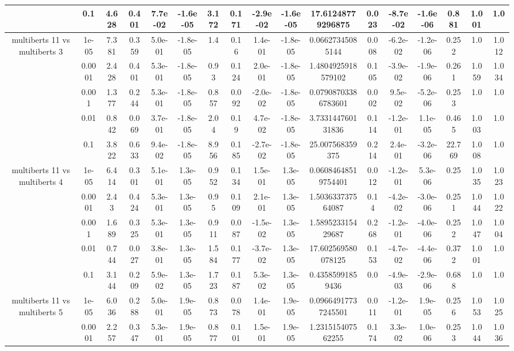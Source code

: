 \begin{tabular}{|c|c|c|c|c|c|c|c|c|c|c|c|c|c|c|c|c|}
 & 0.1 & 4.628 & 0.401 & 7.7e-02 & -1.6e-05 & 3.172 & 0.171 & -2.9e-02 & -1.6e-05 & 17.61248779296875 & 0.023 & -8.7e-02 & -1.6e-06 & 0.881 & 1.001 & 1.0 \\
\hline
\multirow{5}{*}{multiberts 11 vs multiberts 3} & 1e-05 & 7.381 & 0.359 & 5.0e-01 & -1.8e-05 & 1.4 & 0.16 & 1.4e-01 & -1.8e-05 & 0.06627345085144 & 0.008 & -6.2e-02 & -1.2e-06 & 0.252 & 1.0 & 1.012 \\
 & 0.0001 & 2.428 & 0.401 & 5.3e-01 & -1.8e-05 & 0.93 & 0.124 & 2.0e-01 & -1.8e-05 & 1.4804925918579102 & 0.105 & -3.9e-02 & -1.9e-06 & 0.261 & 1.059 & 1.034 \\
 & 0.001 & 1.377 & 0.244 & 5.3e-01 & -1.8e-05 & 0.857 & 0.092 & -2.0e-02 & -1.8e-05 & 0.07908703386783601 & 0.002 & 9.5e-02 & -5.2e-06 & 0.253 & 1.0 & 1.0 \\
 & 0.01 & 0.842 & 0.069 & 3.7e-01 & -1.8e-05 & 2.04 & 0.19 & 4.7e-02 & -1.8e-05 & 3.733144760131836 & 0.114 & -1.2e-01 & 1.1e-05 & 0.465 & 1.003 & 1.0 \\
 & 0.1 & 3.822 & 0.633 & 9.4e-02 & -1.8e-05 & 8.956 & 0.185 & -2.7e-02 & -1.8e-05 & 25.007568359375 & 0.214 & 2.4e-01 & -3.2e-06 & 22.769 & 1.008 & 1.0 \\
\hline
\multirow{5}{*}{multiberts 11 vs multiberts 4} & 1e-05 & 6.414 & 0.301 & 5.1e-01 & 1.3e-05 & 0.952 & 0.134 & 1.5e-01 & 1.3e-05 & 0.06084648519754401 & 0.012 & -1.2e-01 & 5.3e-06 & 0.25 & 1.035 & 1.023 \\
 & 0.0001 & 2.43 & 0.424 & 5.3e-01 & 1.3e-05 & 0.95 & 0.109 & 2.1e-01 & 1.3e-05 & 1.503633737564087 & 0.14 & -4.2e-02 & -3.0e-06 & 0.251 & 1.044 & 1.022 \\
 & 0.001 & 1.689 & 0.325 & 5.3e-01 & 1.3e-05 & 0.911 & 0.087 & -1.5e-02 & 1.3e-05 & 1.589523315429687 & 0.268 & -1.2e-01 & -4.0e-06 & 0.252 & 1.047 & 1.004 \\
 & 0.01 & 0.744 & 0.027 & 3.8e-01 & 1.3e-05 & 1.584 & 0.177 & -3.7e-02 & 1.3e-05 & 17.602569580078125 & 0.153 & -4.7e-02 & -4.4e-06 & 0.372 & 1.001 & 1.0 \\
 & 0.1 & 3.144 & 0.209 & 5.9e-02 & 1.3e-05 & 1.723 & 0.187 & 5.3e-02 & 1.3e-05 & 0.43585991859436 & 0.0 & -4.9e-03 & -2.9e-06 & 0.688 & 1.0 & 1.0 \\
\hline
\multirow{5}{*}{multiberts 11 vs multiberts 5} & 1e-05 & 6.036 & 0.288 & 5.0e-01 & 1.9e-05 & 0.873 & 0.078 & 1.4e-01 & 1.9e-05 & 0.09664917737245501 & 0.011 & -1.2e-01 & 1.9e-05 & 0.256 & 1.053 & 1.025 \\
 & 0.0001 & 2.257 & 0.347 & 5.3e-01 & 1.9e-05 & 0.877 & 0.101 & 1.5e-01 & 1.9e-05 & 1.231515407562255 & 0.174 & 3.3e-02 & 1.0e-06 & 0.253 & 1.044 & 1.036 \\

\end{tabular}
